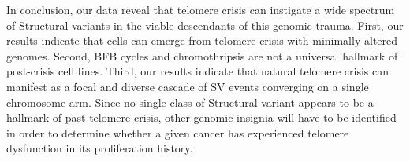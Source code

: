 \documentclass[phd,tocprelim]{cornell}
\begin{document}
In conclusion, our data reveal that telomere crisis can instigate a wide spectrum of Structural variants in the viable descendants of this genomic trauma. First, our results indicate that cells can emerge from telomere crisis with minimally altered genomes. Second, BFB cycles and chromothripsis are not a universal hallmark of post-crisis cell lines. Third, our results indicate that natural telomere crisis can manifest as a focal and diverse cascade of SV events converging on a single chromosome arm. Since no single class of Structural variant appears to be a hallmark of past telomere crisis, other genomic insignia will have to be identified in order to determine whether a given cancer has experienced telomere dysfunction in its proliferation history.


\end{document}
